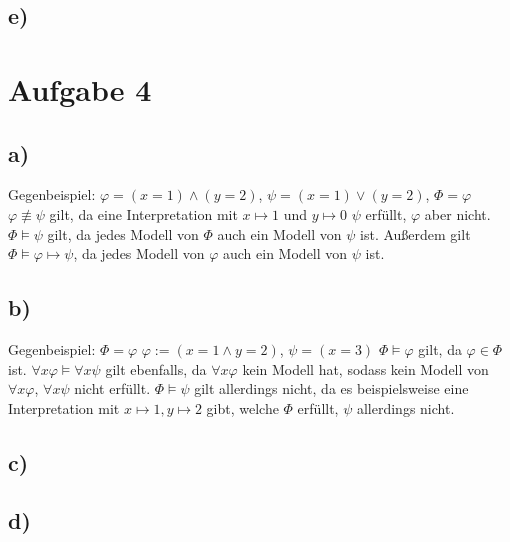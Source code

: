 \documentclass[11pt, a4paper]{article}
\begin{document}
\subsection*{e)}


\section*{Aufgabe 4}
\subsection*{a)}
Gegenbeispiel: $\varphi = (x=1) \land (y=2)$, $\psi = (x=1) \lor (y=2)$, $\Phi = {\varphi}$\newline\newline
$\varphi \not\equiv \psi$ gilt, da eine Interpretation mit $x\mapsto1$ und $y\mapsto0$ $\psi$ erfüllt, $\varphi$ aber nicht. $\Phi \vDash \psi$ gilt, da jedes Modell von $\Phi$ auch ein Modell von $\psi$ ist. Außerdem gilt $\Phi \vDash \varphi \mapsto \psi$, da jedes Modell von $\varphi$ auch ein Modell von $\psi$ ist.

\subsection*{b)}
Gegenbeispiel: $\Phi = {\varphi}$ $\varphi := (x=1 \land y=2)$, $\psi = (x=3)$\newline
$\Phi \vDash \varphi$ gilt, da $\varphi \in \Phi$ ist. $\forall x \varphi \vDash \forall x \psi$ gilt ebenfalls, da $\forall x \varphi$ kein Modell hat, sodass kein Modell von $\forall x \varphi$, $\forall x \psi$ nicht erfüllt. $\Phi \vDash \psi$ gilt allerdings nicht, da es beispielsweise eine Interpretation mit $x \mapsto 1, y \mapsto 2$ gibt, welche $\Phi$ erfüllt, $\psi$ allerdings nicht.

\subsection*{c)}


\subsection*{d)}
\end{document}
